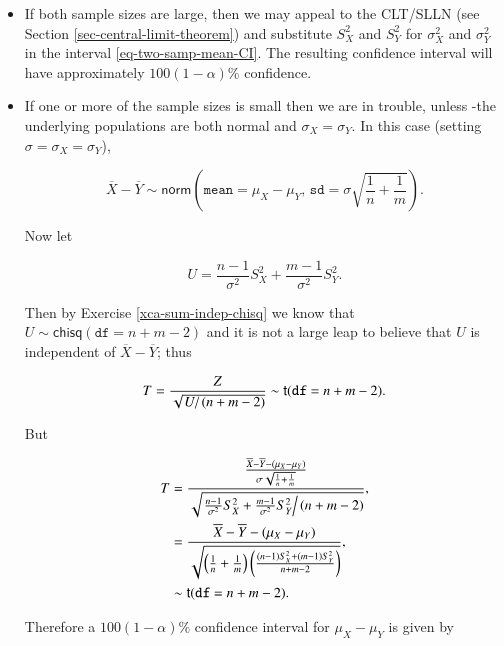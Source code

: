 \documentclass[]{book}
\providecommand{\tightlist}{%
  \setlength{\itemsep}{0pt}\setlength{\parskip}{0pt}}
\numberwithin{equation}{chapter}
\numberwithin{figure}{chapter}
\theoremstyle{plain}
\theoremstyle{definition}
\theoremstyle{remark}
\theoremstyle{definition}
\theoremstyle{definition}
\theoremstyle{remark}
\begin{document}
\begin{itemize}
\tightlist
\item
  If both sample sizes are large, then we may appeal to the CLT/SLLN
  (see Section \ref{sec-central-limit-theorem}) and substitute
  \(S_{X}^{2}\) and \(S_{Y}^{2}\) for \(\sigma_{X}^{2}\) and
  \(\sigma_{Y}^{2}\) in the interval \eqref{eq-two-samp-mean-CI}. The
  resulting confidence interval will have approximately
  \(100(1-\alpha)\%\) confidence.
\item
  If one or more of the sample sizes is small then we are in trouble,
  unless -the underlying populations are both normal and
  \(\sigma_{X}=\sigma_{Y}\). In this case (setting
  \(\sigma=\sigma_{X}=\sigma_{Y}\)),

  \begin{equation}
    \overline{X}-\overline{Y}\sim\mathsf{norm}\left(\mathtt{mean}=\mu_{X}-\mu_{Y},\,\mathtt{sd}=\sigma\sqrt{\frac{1}{n}+\frac{1}{m}}\right).
    \end{equation}

  Now let

  \begin{equation}
    U=\frac{n-1}{\sigma^{2}}S_{X}^{2}+\frac{m-1}{\sigma^{2}}S_{Y}^{2}.
    \end{equation}

  Then by Exercise \ref{xca-sum-indep-chisq} we know that
  \(U\sim\mathsf{chisq}(\mathtt{df}=n+m-2)\) and it is not a large leap
  to believe that \(U\) is independent of \(\overline{X}-\overline{Y}\);
  thus

  \begin{equation}
    T = \frac{Z}{\sqrt{\left.U\right/ (n+m-2)}}\sim\mathsf{t}(\mathtt{df}=n+m-2).
    \end{equation}

  But

  \begin{align*}
    T & =\frac{\frac{\overline{X}-\overline{Y}-(\mu_{X}-\mu_{Y})}{\sigma\sqrt{\frac{1}{n}+\frac{1}{m}}}}{\sqrt{\left.\frac{n-1}{\sigma^{2}}S_{X}^{2}+\frac{m-1}{\sigma^{2}}S_{Y}^{2}\right/ (n+m-2)}},\\
    & =\frac{\overline{X}-\overline{Y}-(\mu_{X}-\mu_{Y})}{\sqrt{\left(\frac{1}{n}+\frac{1}{m}\right)\left(\frac{(n-1)S_{X}^{2}+(m-1)S_{Y}^{2}}{n+m-2}\right)}},\\
    & \sim\mathsf{t}(\mathtt{df}=n+m-2).
    \end{align*}

  Therefore a \(100(1-\alpha)\%\) confidence interval for
  \(\mu_{X}-\mu_{Y}\) is given by


\end{itemize}
\end{document}

